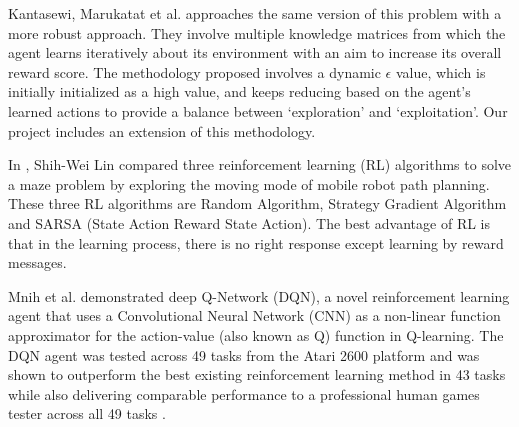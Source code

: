 \documentclass{svproc}
\begin{document}
Kantasewi, Marukatat et al. \cite{kantasewi2019multi} approaches the same version of this problem with a more robust approach. They involve multiple knowledge matrices from which the agent learns iteratively about its environment with an aim to increase its overall reward score. The methodology proposed involves a dynamic $\epsilon$ value, which is initially initialized as a high value, and keeps reducing based on the agent’s learned actions to provide a balance between ‘exploration’ and ‘exploitation’. Our project includes an extension of this methodology.

In \cite{lin2019solving}, Shih-Wei Lin compared three reinforcement learning (RL) algorithms to solve a maze problem by exploring the moving mode of mobile robot path planning. These three RL algorithms are Random Algorithm, Strategy Gradient Algorithm and SARSA (State Action Reward State Action). The best advantage of RL is that in the learning process, there is no right response except learning by reward messages. 


Mnih et al. \cite{mnih2013playing} demonstrated deep Q-Network (DQN), a novel reinforcement learning agent that uses a Convolutional Neural Network (CNN) as a non-linear function approximator for the action-value (also known as Q) function in Q-learning. The DQN agent was tested across 49 tasks from the Atari 2600 platform and was shown to outperform the best existing reinforcement learning method in 43 tasks while also delivering comparable performance to a professional human games tester across all 49 tasks \citep{mnih2015human}.

\end{document}
